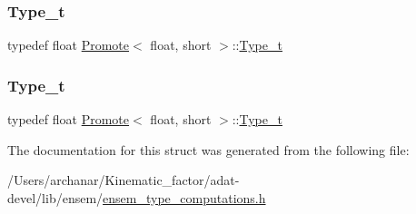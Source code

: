 \subsubsection{\texorpdfstring{Type\_t}{Type\_t}\hspace{0.1cm}{\footnotesize\ttfamily [2/3]}}
{\footnotesize\ttfamily typedef float \mbox{\hyperlink{structPromote}{Promote}}$<$ float, short $>$\+::\mbox{\hyperlink{structPromote_3_01float_00_01short_01_4_a9c8232afdf3f68f947e67d59a16fd670}{Type\+\_\+t}}}

\mbox{\label{structPromote_3_01float_00_01short_01_4_a9c8232afdf3f68f947e67d59a16fd670}} 
\subsubsection{\texorpdfstring{Type\_t}{Type\_t}\hspace{0.1cm}{\footnotesize\ttfamily [3/3]}}
{\footnotesize\ttfamily typedef float \mbox{\hyperlink{structPromote}{Promote}}$<$ float, short $>$\+::\mbox{\hyperlink{structPromote_3_01float_00_01short_01_4_a9c8232afdf3f68f947e67d59a16fd670}{Type\+\_\+t}}}



The documentation for this struct was generated from the following file\+:\begin{DoxyCompactItemize}
\item 
/\+Users/archanar/\+Kinematic\+\_\+factor/adat-\/devel/lib/ensem/\mbox{\hyperlink{adat-devel_2lib_2ensem_2ensem__type__computations_8h}{ensem\+\_\+type\+\_\+computations.\+h}}\end{DoxyCompactItemize}
